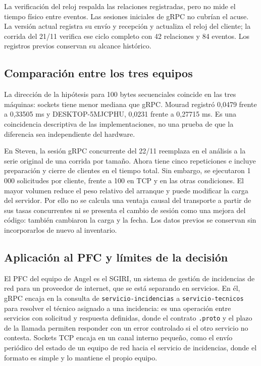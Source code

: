La verificación del reloj respalda las relaciones registradas, pero
no mide el tiempo físico entre eventos. Las sesiones iniciales de gRPC no cubrían el acuse. La versión
actual registra su envío y recepción y actualiza el reloj del cliente;
la corrida del 21/11 verifica ese ciclo completo con 42 relaciones
y 84 eventos. Los registros previos conservan su alcance histórico.

\subsection{Comparación entre los tres equipos}
La dirección de la hipótesis para 100 bytes secuenciales coincide en
las tres máquinas: sockets tiene menor mediana que gRPC. Mourad
registró 0,0479 frente a 0,33505 ms y DESKTOP-5MJCPHU, 0,0231 frente
a 0,27715 ms. Es una coincidencia descriptiva de las implementaciones,
no una prueba de que la diferencia sea independiente del hardware.

En Steven, la sesión gRPC concurrente del 22/11 reemplaza en el
análisis a la serie original de una corrida por tamaño. Ahora tiene
cinco repeticiones e incluye preparación y cierre de clientes en el
tiempo total. Sin embargo, se ejecutaron 1\,000 solicitudes por cliente,
frente a 100 en TCP y en las otras condiciones. El mayor volumen
reduce el peso relativo del arranque y puede modificar la carga del
servidor. Por ello no se calcula una ventaja causal del transporte
a partir de sus tasas concurrentes ni se presenta el cambio de sesión
como una mejora del código: también cambiaron la carga y la fecha.
Los datos previos se conservan sin incorporarlos de nuevo al inventario.

\subsection{Aplicación al PFC y límites de la decisión}
El PFC del equipo de Angel es el SGIRI, un sistema de gestión de
incidencias de red para un proveedor de internet, que se está separando
en servicios. En él, gRPC encaja en la consulta de
\texttt{servicio-incidencias} a \texttt{servicio-tecnicos} para
resolver el técnico asignado a una incidencia: es una operación entre
servicios con solicitud y respuesta definidas, donde el contrato
\texttt{.proto} y el plazo de la llamada permiten responder con un
error controlado si el otro servicio no contesta. Sockets TCP encaja
en un canal interno pequeño, como el envío periódico del estado de un
equipo de red hacia el servicio de incidencias, donde el formato es
simple y lo mantiene el propio equipo.

